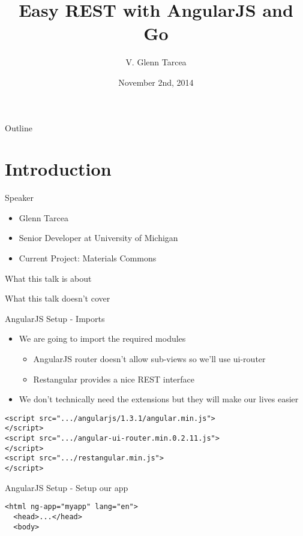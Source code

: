 \documentclass[presentation]{beamer}
\author{V. Glenn Tarcea}
\date{November 2nd, 2014}
\title{Easy REST with AngularJS and Go}
\begin{document}
\maketitle
\begin{frame}{Outline}
\tableofcontents
\end{frame}


\section{Introduction}
\label{sec-1}

\begin{frame}[label=sec-1-1]{Speaker}
\begin{itemize}
\item Glenn Tarcea
\item Senior Developer at University of Michigan
\item Current Project: Materials Commons
\end{itemize}
\end{frame}

\begin{frame}[label=sec-1-2]{What this talk is about}
\end{frame}

\begin{frame}[label=sec-1-3]{What this talk doesn't cover}
\end{frame}

\begin{frame}[fragile,label=sec-1-4]{AngularJS Setup - Imports}
 \begin{itemize}
\item We are going to import the required modules
\begin{itemize}
\item AngularJS router doesn't allow sub-views so we'll use ui-router
\item Restangular provides a nice REST interface
\end{itemize}
\item We don't technically need the extensions but they will make our lives easier
\end{itemize}
\begin{verbatim}
<script src=".../angularjs/1.3.1/angular.min.js">
</script>
<script src=".../angular-ui-router.min.0.2.11.js">
</script>
<script src=".../restangular.min.js">
</script>
\end{verbatim}
\end{frame}

\begin{frame}[fragile,label=sec-1-5]{AngularJS Setup - Setup our app}
 \begin{verbatim}
<html ng-app="myapp" lang="en">
  <head>...</head>
  <body>
\end{verbatim}
\end{frame}
\end{document}
